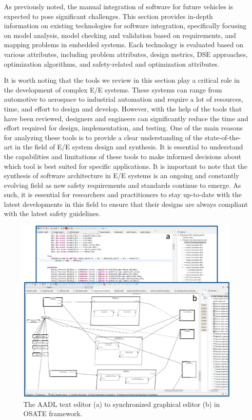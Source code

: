 As previously noted, the manual integration of software for future vehicles is expected to pose significant challenges. This section provides in-depth information on existing technologies for software integration, specifically focusing on model analysis, model checking and validation based on requirements, and mapping problems in embedded systems. Each technology is evaluated based on various attributes, including problem attributes, design metrics, DSE approaches, optimization algorithms, and safety-related and optimization attributes.

It is worth noting that the tools we review in this section play a critical role in the development of complex E/E systems. These systems can range from automotive to aerospace to industrial automation and require a lot of resources, time, and effort to design and develop. However, with the help of the tools that have been reviewed, designers and engineers can significantly reduce the time and effort required for design, implementation, and testing. One of the main reasons for analyzing these tools is to provide a clear understanding of the state-of-the-art in the field of E/E system design and synthesis. It is essential to understand the capabilities and limitations of these tools to make informed decisions about which tool is best suited for specific applications. It is important to note that the synthesis of software architecture in E/E systems is an ongoing and constantly evolving field as new safety requirements and standards continue to emerge. As such, it is essential for researchers and practitioners to stay up-to-date with the latest developments in this field to ensure that their designs are always compliant with the latest safety guidelines.

\begin{figure}[ht]
\centering
\includegraphics[width=\textwidth]{figures/osate_project.pdf}
\caption{ The AADL text editor (a) to synchronized graphical editor (b) in OSATE framework.}
\label{fig41}
\end{figure}


